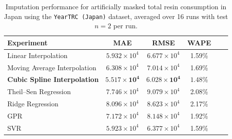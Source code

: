 \begin{table}[!ht]
	\centering
	\caption{\centering Imputation performance for artificially masked total resin consumption in Japan using the \texttt{YearTRC (Japan)} dataset, averaged over 16 runs with test \(n=2\) per run.}
	\begin{tabular}{@{}lccccc@{}}
		\toprule
		\textbf{Experiment}                 & \textbf{MAE}                   & \textbf{RMSE}                  & \textbf{WAPE}       \\
		\midrule
		Linear Interpolation                & \(5.932 \times 10^4\)          & \(6.677 \times 10^4\)          & 1.59\%              \\
		Moving Average Interpolation        & \(6.308 \times 10^4\)          & \(7.014 \times 10^4\)          & 1.69\%              \\
		\textbf{Cubic Spline Interpolation} & \(\mathbf{5.517 \times 10^4}\) & \(\mathbf{6.028 \times 10^4}\) & \(\mathbf{1.48}\)\% \\
		Theil--Sen Regression               & \(7.746 \times 10^4\)          & \(9.079 \times 10^4\)          & 2.08\%              \\
		Ridge Regression                    & \(8.096 \times 10^4\)          & \(8.623 \times 10^4\)          & 2.17\%              \\
		GPR                                 & \(7.172 \times 10^4\)          & \(8.148 \times 10^4\)          & 1.92\%              \\
		SVR                                 & \(5.923 \times 10^4\)          & \(6.377 \times 10^4\)          & 1.59\%              \\
		\hline
	\end{tabular}
	\label{tab:imputation_japan_trc}
\end{table}
